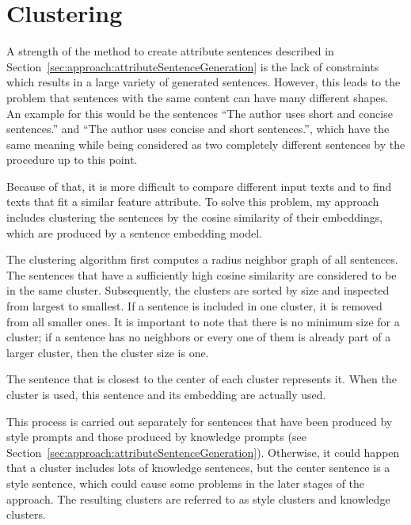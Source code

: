 \section{Clustering}
\label{sec:approach:clustering}
A strength of the method to create attribute sentences described in Section~\ref{sec:approach:attributeSentenceGeneration} is the lack of constraints which results in a large variety of generated sentences. However, this leads to the problem that sentences with the same content can have many different shapes. An example for this would be the sentences \enquote{The author uses short and concise sentences.} and \enquote{The author uses concise and short sentences.}, which have the same meaning while being considered as two completely different sentences by the procedure up to this point.

Because of that, it is more difficult to compare different input texts and to find texts that fit a similar feature attribute.
To solve this problem, my approach includes clustering the sentences by the cosine similarity of their embeddings, which are produced by a sentence embedding model.

The clustering algorithm first computes a radius neighbor graph of all sentences. The sentences that have a sufficiently high cosine similarity are considered to be in the same cluster. Subsequently, the clusters are sorted by size and inspected from largest to smallest. If a sentence is included in one cluster, it is removed from all smaller ones. It is important to note that there is no minimum size for a cluster; if a sentence has no neighbors or every one of them is already part of a larger cluster, then the cluster size is one.

The sentence that is closest to the center of each cluster represents it. When the cluster is used, this sentence and its embedding are actually used.

This process is carried out separately for sentences that have been produced by style prompts and those produced by knowledge prompts (see Section~\ref{sec:approach:attributeSentenceGeneration}). Otherwise, it could happen that a cluster includes lots of knowledge sentences, but the center sentence is a style sentence, which could cause some problems in the later stages of the approach. %
The resulting clusters are referred to as style clusters and knowledge clusters.


